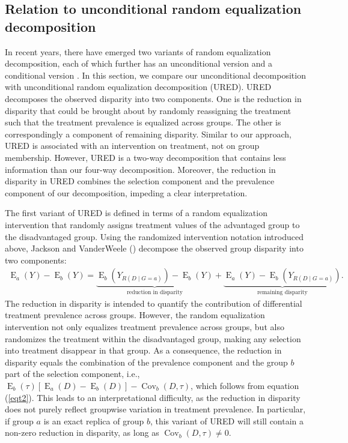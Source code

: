 \documentclass[12pt,a4paper]{article}
\newcommand{\Cov}{\operatorname{Cov}}
\newcommand{\E}{\operatorname{E}}
\begin{document}
\subsection{Relation to unconditional random equalization decomposition}
In recent years, there have emerged two variants of random equalization decomposition, each of which further has an unconditional version and a conditional version \citep{vanderweele_causal_2014, jackson_decomposition_2018, sudharsanan_educational_2021, lundberg_gap-closing_2022,park_sensitivity_2023}. In this section, we compare our unconditional decomposition with unconditional random equalization decomposition (URED). URED decomposes the observed disparity into two components. One is the reduction in disparity that could be brought about by randomly reassigning the treatment such that the treatment prevalence is equalized across groups. The other is correspondingly a component of remaining disparity. Similar to our approach, URED is associated with an intervention on treatment, not on group membership. However, URED is a two-way decomposition that contains less information than our four-way decomposition. Moreover, the reduction in disparity in URED combines the selection component and the prevalence component of our decomposition, impeding a clear interpretation.

The first variant of URED is defined in terms of a random equalization intervention that randomly assigns treatment values of the advantaged group to the disadvantaged group.
Using the randomized intervention notation introduced above, Jackson and VanderWeele 
 (\citeyear{jackson_decomposition_2018}) decompose the observed group disparity into two components:
\begin{gather}
\E_a(Y)-\E_b(Y)=\underbrace{\E_b \left(Y_{R(D \mid G=a)} \right)-\E_b(Y)}_{\text{reduction in disparity}} + \underbrace{\E_a(Y)-\E_b \left(Y_{R(D \mid G=a)} \right)}_{\text{remaining disparity}} .  \nonumber 
\end{gather}
The reduction in disparity is intended to quantify the contribution of differential treatment prevalence across groups. 
However, the random equalization intervention not only equalizes treatment prevalence across groups, but also randomizes the treatment within the disadvantaged group, making any selection into treatment disappear in that group. As a consequence, the reduction in disparity equals the combination of the prevalence component and the group $b$ part of the selection component, i.e., $\E_b(\tau)[\E_a(D)-\E_b(D)]-\Cov_b(D, \tau)$, which follows from equation (\ref{eqt2}). This leads to an interpretational difficulty, as the reduction in disparity does not purely reflect groupwise variation in treatment prevalence. In particular, if group $a$ is an exact replica of group $b$, this variant of URED will still contain a non-zero reduction in disparity, as long as $\Cov_b(D, \tau) \neq 0$.
\end{document}
